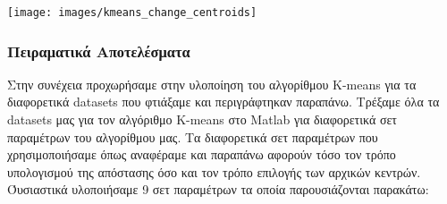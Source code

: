 \noindent\begin{minipage}{\linewidth}
    \centering
    \texttt{[image: images/kmeans\_change\_centroids]}
    \label{fig:kmeans_change_centroids}
\end{minipage}

\subsubsection{Πειραματικά Αποτελέσματα}

Στην συνέχεια προχωρήσαμε στην υλοποίηση του αλγορίθμου K-means για τα διαφορετικά datasets που φτιάξαμε και περιγράφτηκαν παραπάνω. Τρέξαμε όλα τα datasets μας για τον αλγόριθμο K-means στο Matlab για διαφορετικά σετ παραμέτρων του αλγορίθμου μας. Τα διαφορετικά σετ παραμέτρων που χρησιμοποιήσαμε όπως αναφέραμε και παραπάνω αφορούν τόσο τον τρόπο υπολογισμού της απόστασης όσο και τον τρόπο επιλογής των αρχικών κεντρών. Όυσιαστικά υλοποιήσαμε 9 σετ παραμέτρων τα οποία παρουσιάζονται παρακάτω:

